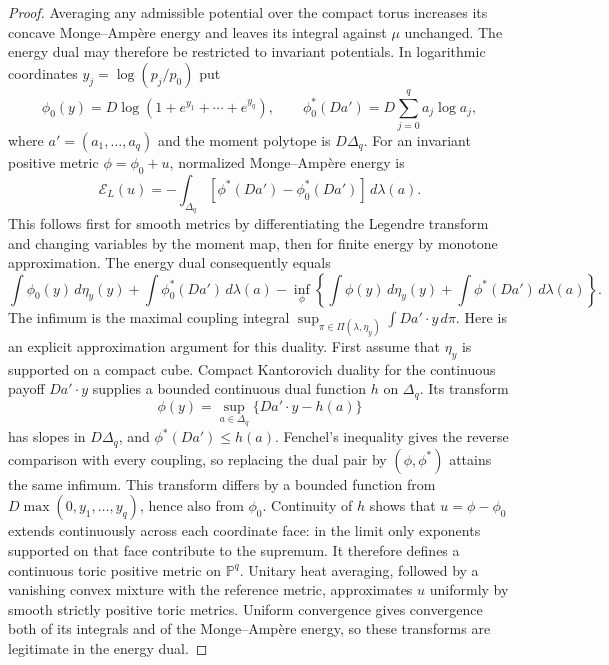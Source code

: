 \begin{proof}
Averaging any admissible potential over the compact torus increases its
concave Monge--Amp\`ere energy and leaves its integral against $\mu$
unchanged. The energy dual may therefore be restricted to invariant
potentials. In logarithmic coordinates
$y_j=\log(p_j/p_0)$ put
\[
 \phi_0(y)=D\log(1+e^{y_1}+\cdots+e^{y_q}),\qquad
 \phi_0^*(Da')=D\sum_{j=0}^q a_j\log a_j,
\]
where $a'=(a_1,\ldots,a_q)$ and the moment polytope is $D\Delta_q$.
For an invariant positive metric $\phi=\phi_0+u$, normalized
Monge--Amp\`ere energy is
\[
 \mathcal E_L(u)=-\int_{\Delta_q}
                   [\phi^*(Da')-\phi_0^*(Da')]\,d\lambda(a).
\]
This follows first for smooth metrics by differentiating the Legendre
transform and changing variables by the moment map, then for finite
energy by monotone approximation. The energy dual consequently equals
\[
 \int\phi_0(y)\,d\eta_y(y)+\int\phi_0^*(Da')\,d\lambda(a)
 -\inf_\phi\left\{\int\phi(y)\,d\eta_y(y)
                   +\int\phi^*(Da')\,d\lambda(a)\right\}.
\]
The infimum is the maximal coupling integral
$\sup_{\pi\in\Pi(\lambda,\eta_y)}\int D a'\cdot y\,d\pi$.
Here is an explicit approximation argument for this duality.  First
assume that $\eta_y$ is supported on a compact cube.  Compact
Kantorovich duality for the continuous payoff $D a'\cdot y$ supplies
a bounded continuous dual function $h$ on $\Delta_q$.  Its transform
\[
 \phi(y)=\sup_{a\in\Delta_q}\{D a'\cdot y-h(a)\}
\]
has slopes in $D\Delta_q$, and $\phi^*(Da')\le h(a)$.
Fenchel's inequality gives the reverse comparison with every
coupling, so replacing the dual pair by $(\phi,\phi^*)$ attains
the same infimum.  This transform differs by a bounded function from
$D\max(0,y_1,\ldots,y_q)$, hence also from $\phi_0$.
Continuity of $h$ shows that $u=\phi-\phi_0$ extends continuously
across each coordinate face: in the limit only exponents supported
on that face contribute to the supremum.  It therefore defines a
continuous toric positive metric on $\mathbb P^q$.  Unitary heat
averaging, followed by a vanishing convex mixture with the reference
metric, approximates $u$ uniformly by smooth strictly positive toric
metrics.  Uniform convergence gives convergence both of its integrals
and of the Monge--Amp\`ere energy, so these transforms are legitimate
in the energy dual.


\end{proof}
